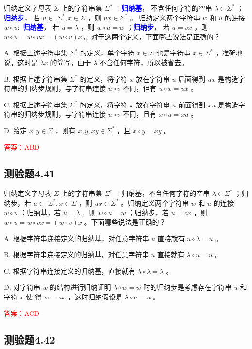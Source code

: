 \documentclass[UTF8, heading=true]{ctexart}
\begin{document}
归纳定义字母表 $\Sigma $ 上的字符串集 $\Sigma^*$ ：\textcolor{blue}{\textbf{归纳基}}，
不含任何字符的空串 $\lambda \in \Sigma^*$ ；\textcolor{blue}{\textbf{归纳步}}，
若 $u \in$ $\Sigma^*, x \in \Sigma$ ，则 $u x \in \Sigma^*$ 。
归纳定义两个字符串 $w$ 和 $u$ 的连接 $w \circ u:$ \textcolor{blue}{\textbf{归纳基}}，
若 $u=\lambda$ ，则 $w \circ u=w$ ；\textcolor{blue}{\textbf{归纳步}}，
若 $u=v x$ ，则 $w \circ u=w \circ v x=(w \circ v) x$ 。对于这两个定义，下面哪些说法是正确的？

A. 根据上述字符串集 $\Sigma^*$ 的定义，单个字符 $x \in \Sigma$ 也是字符串 $x \in \Sigma^*$ ，准确地说，这时是 $\lambda x$ 的简写，由于 $\lambda$ 不含任何字符，所以被省去。

B. 根据上述字符串集 $\Sigma^*$ 的定义，将字符 $x$ 放在字符串 $u$ 后面得到 $u x$ 是构造字符串的归纳步规则，与字符串连接 $u \circ v$ 不同，但有 $u \circ x=u x$ 。

C. 根据上述字符串集 $\Sigma^*$ 的定义，将字符 $x$ 放在字符串 $u$ 前面得到 $x u$ 是构造字符串的归纳步规则，与字符串连接 $u \circ v$ 不同，且有 $x \circ u=x u$ 。

D. 给定 $x, y \in \Sigma$ ，则有 $x, y, x y \in \Sigma^*$ ，且 $x \circ y=x y$ 。

\textcolor{red}{答案：ABD}

\subsection{测验题4.41}

归纳定义字母表 $\Sigma$ 上的字符串集 $\Sigma^*$ ：归纳基，不含任何字符的空串 $\lambda \in \Sigma^*$ ；归纳步，若 $u \in$ $\Sigma^*, x \in \Sigma$ ，则 $u x \in \Sigma^*$ 。归纳定义两个字符串 $w$ 和 $u$ 的连接 $w \circ u$ ：归纳基，若 $u=\lambda$ ，则 $w \circ u=w$ ；归纳步，若 $u=v x$ ，则 $w \circ u=w \circ v x=(w \circ v) x$ 。下面哪些说法是正确的？

A. 根据字符串连接定义的归纳基，对任意字符串 $u$ 直接就有 $u \circ \lambda=u$ 。

B. 根据字符串连接定义的归纳基，对任意字符串 $u$ 直接就有 $\lambda \circ u=u$ 。

C. 根据字符串连接定义的归纳基，直接就有 $\lambda \circ \lambda=\lambda$ 。

D. 对字符串 $w$ 的结构进行归纳证明 $\lambda \circ w=w$ 时的归纳步是考虑存在字符串 $u$ 和字符 $x$ 使
得 $w=u x$ ，这时归纳假设是 $\lambda \circ u=u$ 。


\textcolor{red}{答案：ACD}

\subsection{测验题4.42}
\end{document}
